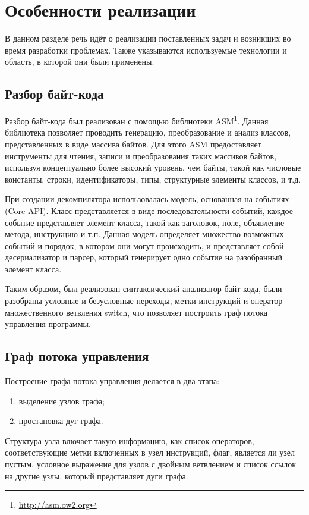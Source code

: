 \documentclass[14pt]{extarticle}
\begin{document}
\pagebreak

\section{Особенности реализации}

В данном разделе речь идёт о реализации поставленных задач и возникших во время разработки проблемах. Также указываются используемые технологии и область, в которой они были применены.

\subsection{Разбор байт-кода}

Разбор байт-кода был реализован с помощью библиотеки ASM\footnote{\url{http://asm.ow2.org}}. Данная библиотека позволяет проводить генерацию, преобразование и анализ классов, представленных в виде массива байтов. Для этого ASM предоставляет инструменты для чтения, записи и преобразования таких массивов байтов, используя концептуально более высокий уровень, чем байты, такой как числовые константы, строки, идентификаторы, типы, структурные элементы классов, и т.д. 	

При создании декомпилятора использовалась модель, основанная на событиях (Core API). Класс представляется в виде последовательности событий, каждое событие представляет элемент класса, такой как заголовок, поле, объявление метода, инструкцию и т.п. Данная модель определяет множество возможных событий и порядок, в котором они могут происходить, и представляет собой десериализатор и парсер, который генерирует одно событие на разобранный элемент класса\cite{asm}.

Таким образом, был реализован синтаксический анализатор байт-кода, были разобраны условные и безусловные переходы, метки инструкций и оператор множественного ветвления switch, что позволяет построить граф потока управления программы. 

\newpage
\subsection{Граф потока управления}
Построение графа потока управления делается в два этапа:
\begin{enumerate}
\item выделение узлов графа;
\item простановка дуг графа.
\end{enumerate}

Структура узла влючает такую информацию, как список операторов, соответствующие метки включенных в узел инструкций, флаг, является ли узел пустым, условное выражение для узлов с двойным ветвлением и список ссылок на другие узлы, который представляет дуги графа.
\end{document}
